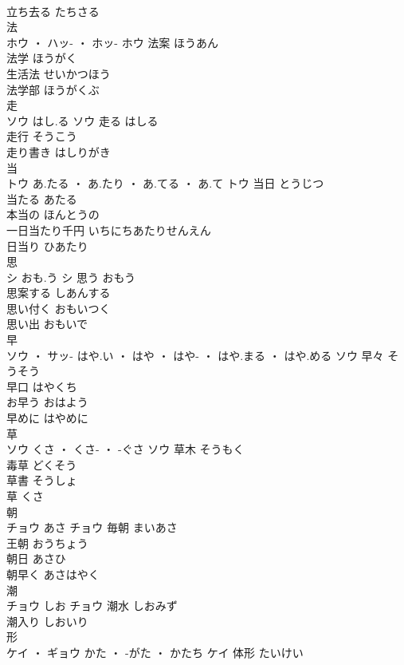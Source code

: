 \documentclass[8pt]{extreport}
\begin{document}
\begin{CJK}{UTF8}{min}
\\	立ち去る	たちさる	
\\	法	
\\	ホウ ・ ハッ- ・ ホッ-		ホウ	法案	ほうあん	
\\	法学	ほうがく	
\\	生活法	せいかつほう	
\\	法学部	ほうがくぶ	
\\	走	
\\	ソウ	はし.る	ソウ	走る	はしる	
\\	走行	そうこう	
\\	走り書き	はしりがき	
\\	当	
\\	トウ	あ.たる ・ あ.たり ・ あ.てる ・ あ.て	トウ	当日	とうじつ	
\\	当たる	あたる	
\\	本当の	ほんとうの	
\\	一日当たり千円	いちにちあたりせんえん	
\\	日当り	ひあたり	
\\	思	
\\	シ	おも.う	シ	思う	おもう	
\\	思案する	しあんする	
\\	思い付く	おもいつく	
\\	思い出	おもいで	
\\	早	
\\	ソウ ・ サッ-	はや.い ・ はや ・ はや- ・ はや.まる ・ はや.める	ソウ	早々	そうそう	
\\	早口	はやくち	
\\	お早う	おはよう	
\\	早めに	はやめに	
\\	草	
\\	ソウ	くさ ・ くさ- ・ -ぐさ	ソウ	草木	そうもく	
\\	毒草	どくそう	
\\	草書	そうしょ	
\\	草	くさ	
\\	朝	
\\	チョウ	あさ	チョウ	毎朝	まいあさ	
\\	王朝	おうちょう	
\\	朝日	あさひ	
\\	朝早く	あさはやく	
\\	潮	
\\	チョウ	しお	チョウ													潮水	しおみず	
\\	潮入り	しおいり	
\\	形	
\\	ケイ ・ ギョウ	かた ・ -がた ・ かたち	ケイ	体形	たいけい	

\end{CJK}
\end{document}

